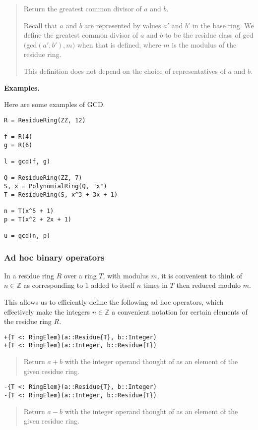 \documentclass[a4paper,10pt]{article}
\newcommand{\Z}{\mathbb{Z}}
\newcommand{\desc}[1]{\vspace{-3mm}\begin{quote}#1\end{quote}}
\begin{document}
\desc{Return the greatest common divisor of $a$ and $b$. 

Recall that $a$ and $b$ are represented by values $a'$ and $b'$ in the base
ring. We define the greatest common divisor of $a$ and $b$ to be the residue
class of gcd$($gcd$(a', b'), m)$ when that is defined, where $m$ is the
modulus of the residue ring.

This definition does not depend on the choice of representatives of
$a$ and $b$.}

\textbf{Examples.}

Here are some examples of GCD.

\begin{lstlisting}
R = ResidueRing(ZZ, 12)

f = R(4)
g = R(6)

l = gcd(f, g)

Q = ResidueRing(ZZ, 7)
S, x = PolynomialRing(Q, "x")
T = ResidueRing(S, x^3 + 3x + 1)

n = T(x^5 + 1)
p = T(x^2 + 2x + 1)

u = gcd(n, p)
\end{lstlisting}

\subsubsection{Ad hoc binary operators}

In a residue ring $R$ over a ring $T$, with modulus $m$, it is convenient
to think of $n \in \Z$ as corresponding to $1$ added to itself $n$ times
in $T$ then reduced modulo $m$.

This allows us to efficiently define the following ad hoc operators, which
effectively make the integers $n \in \Z$ a convenient notation for certain
elements of the residue ring $R$.

\begin{lstlisting}
+{T <: RingElem}(a::Residue{T}, b::Integer)
+{T <: RingElem}(a::Integer, b::Residue{T})
\end{lstlisting}

\desc{Return $a + b$ with the integer operand thought of as an element of 
the given residue ring.}

\begin{lstlisting}
-{T <: RingElem}(a::Residue{T}, b::Integer)
-{T <: RingElem}(a::Integer, b::Residue{T})
\end{lstlisting}

\desc{Return $a - b$ with the integer operand thought of as an element of 
the given residue ring.}
\end{document}
